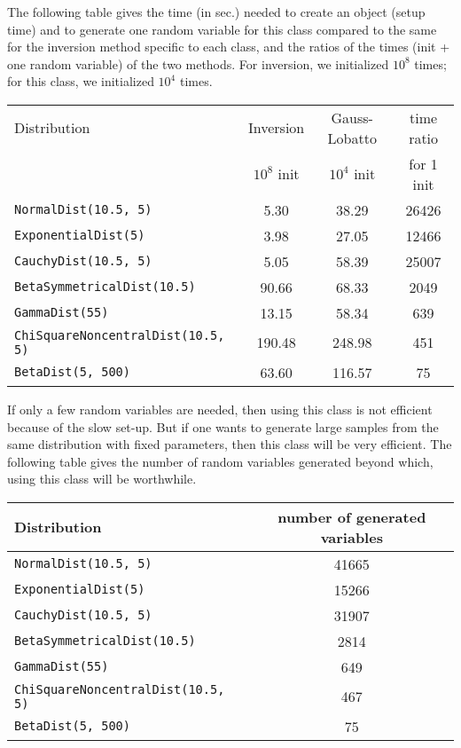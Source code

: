 The following table gives the time (in sec.) needed to
create an object (setup time) and to generate one random variable for
this class compared to the same for the inversion method specific to each class,
and the ratios of the times (init + one random variable) of the two methods.
For inversion, we initialized $10^8$ times; for this class, we
initialized $10^4$ times.

\begin{center}
\begin{tabular}{|l|c|c|c|}
\hline
 Distribution  &Inversion & Gauss-Lobatto &  time ratio  \\
   & $10^8$ init   &  $10^4$ init & for 1 init \\
\hline
\texttt{NormalDist(10.5, 5)} &\phantom{00}5.30 &\phantom{0}38.29 &  26426  \\
\texttt{ExponentialDist(5)}   &\phantom{00}3.98 &\phantom{0}27.05 & 12466 \\
\texttt{CauchyDist(10.5, 5)}  &\phantom{00}5.05 &\phantom{0}58.39 & 25007   \\
\texttt{BetaSymmetricalDist(10.5)}  &\phantom{0}90.66 &  \phantom{0}68.33 & \phantom{0}2049 \\
\texttt{GammaDist(55)}       &\phantom{0}13.15 & \phantom{0}58.34  & \phantom{00}639  \\
\texttt{ChiSquareNoncentralDist(10.5, 5)} &190.48 & 248.98& \phantom{00}451  \\
\texttt{BetaDist(5, 500)}    &\phantom{0}63.60 & 116.57  & \phantom{000}75  \\
\hline
\end{tabular}
\end{center}

If only a few random variables are needed, then using this class
is not efficient because of the slow set-up. But if one wants to generate
large samples from the same distribution with fixed parameters, then
this class will be very efficient. The following table gives the number of
random variables generated beyond which, using this class will be
worthwhile.

\begin{center}
\begin{tabular}{|l|c|}
\hline
 Distribution  &  number of generated variables  \\
\hline
\texttt{NormalDist(10.5, 5)} &  41665  \\
\texttt{ExponentialDist(5)}   & 15266 \\
\texttt{CauchyDist(10.5, 5)}  & 31907   \\
\texttt{BetaSymmetricalDist(10.5)}    & 2814 \\
\texttt{GammaDist(55)}         &  649  \\
\texttt{ChiSquareNoncentralDist(10.5, 5)} &  467 \\
\texttt{BetaDist(5, 500)}      & 75  \\
\hline
\end{tabular}
\end{center}

